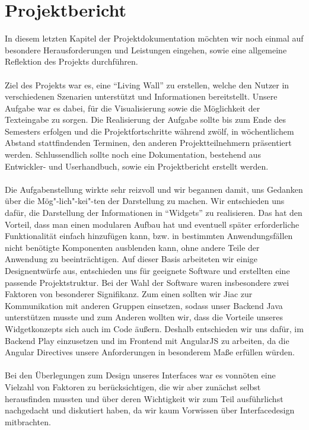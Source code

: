 \documentclass[10pt,a4paper]{report}
\begin{document}
\chapter{Projektbericht}
	In diesem letzten Kapitel der Projektdokumentation möchten wir noch einmal auf besondere Herausforderungen und Leistungen eingehen, sowie eine allgemeine Reflektion des Projekts durchführen.\\\\
	Ziel des Projekts war es, eine "`Living Wall"' zu erstellen, welche den Nutzer in verschiedenen Szenarien unterstützt und Informationen bereitstellt. Unsere Aufgabe war es dabei, für die Visualisierung sowie die Möglichkeit der Texteingabe zu sorgen. Die Realisierung der Aufgabe sollte bis zum Ende des Semesters erfolgen und die Projektfortschritte während zwölf, in wöchentlichem Abstand stattfindenden Terminen, den anderen Projektteilnehmern präsentiert werden. Schlussendlich sollte noch eine Dokumentation, bestehend aus Entwickler- und Userhandbuch, sowie ein Projektbericht erstellt werden.\\\\
	Die Aufgabenstellung wirkte sehr reizvoll und wir begannen damit, uns Gedanken über die Mög"-lich"-kei"-ten der Darstellung zu machen. Wir entschieden uns dafür, die Darstellung der Informationen in "`Widgets"' zu realisieren. Das hat den Vorteil, dass man einen modularen Aufbau hat und eventuell später erforderliche Funktionalität einfach hinzufügen kann, bzw. in bestimmten Anwendungsfällen nicht benötigte Komponenten ausblenden kann, ohne andere Teile der Anwendung zu beeinträchtigen. Auf dieser Basis arbeiteten wir einige Designentwürfe aus, entschieden uns für geeignete Software und erstellten eine passende Projektstruktur. Bei der Wahl der Software waren insbesondere zwei Faktoren von besonderer Signifikanz. Zum einen sollten wir Jiac zur Kommunikation mit anderen Gruppen einsetzen, sodass unser Backend Java unterstützen musste und zum Anderen wollten wir, dass die Vorteile unseres Widgetkonzepts sich auch im Code äußern. Deshalb entschieden wir uns dafür, im Backend Play einzusetzen und im Frontend mit AngularJS zu arbeiten, da die Angular Directives unsere Anforderungen in besonderem Maße erfüllen würden.\\\\
	Bei den Überlegungen zum Design unseres Interfaces war es vonnöten eine Vielzahl von Faktoren zu berücksichtigen, die wir aber zunächst selbst herausfinden mussten und über deren Wichtigkeit wir zum Teil ausführlichst nachgedacht und diskutiert haben, da wir kaum Vorwissen über Interfacedesign mitbrachten.\\\\
\end{document}
